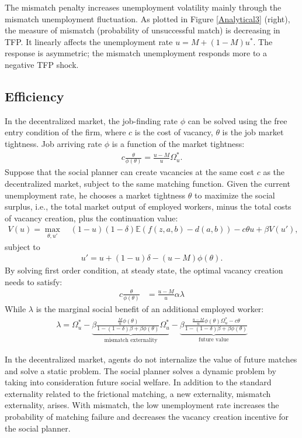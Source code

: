 \documentclass[12pt]{article}
\newcommand{\E}{\mathbb{E}}
\newcommand{\1}{\mathbb{1}}
\begin{document}
The mismatch penalty increases unemployment volatility mainly through the mismatch unemployment fluctuation. As plotted in Figure \ref{Analytical3} (right), the measure of mismatch (probability of unsuccessful match) is decreasing in TFP. It linearly affects the unemployment rate $u = M + (1-M)u^*$. The response is asymmetric; the mismatch unemployment responds more to a negative TFP shock. 

\subsection{Efficiency}
In the decentralized market, the job-finding rate $\phi$ can be solved using the free entry condition of the firm, where $c$ is the cost of vacancy, $\theta$ is the job market tightness. Job arriving rate $\phi$ is a function of the market tightness:
\begin{align*}
c\frac{\theta}{\phi(\theta)} = \frac{u-M}{u}\Omega_u^*.
\end{align*}
Suppose that the social planner can create vacancies at the same cost $c$ as the decentralized market, subject to the same matching function. Given the current unemployment rate, he chooses a market tightness $\theta$ to maximize the social surplus, i.e., the total market output of employed workers, minus the total costs of vacancy creation, plus the continuation value: 
\begin{align*}
V(u) = \max_{\theta,u'}\quad (1-u)(1-\delta)\E(f(z,a,b)-d(a,b))-c\theta u+\beta V(u'),
\end{align*}
subject to 
\begin{align*}
u' = u+(1-u)\delta-(u-M)\phi(\theta).
\end{align*}
By solving first order condition, at steady state, the optimal vacancy creation needs to satisfy:
\begin{align*}
c\frac{\theta}{\phi(\theta)} &= \frac{u-M}{u}\alpha\lambda 
\end{align*}
While $\lambda$ is the marginal social benefit of an additional employed worker: 
\begin{align*}
\lambda =\Omega_u^*-\underbrace{\beta\frac{\frac{M}{u}\phi(\theta)}{1-(1-\delta)\beta+\beta\phi(\theta)}\Omega_u^*}_{\text{mismatch externality}} -\underbrace{\beta\frac{\frac{u-M}{u}\phi(\theta)\Omega_u^*-c\theta}{1-(1-\delta)\beta+\beta\phi(\theta)}}_{\text{future value}}
\end{align*}

In the decentralized market, agents do not internalize the value of future matches and solve a static problem. The social planner solves a dynamic problem by taking into consideration future social welfare. In addition to the standard externality related to the frictional matching, a new externality, mismatch externality, arises. With mismatch, the low unemployment rate increases the probability of matching failure and decreases the vacancy creation incentive for the social planner. 
\end{document}
